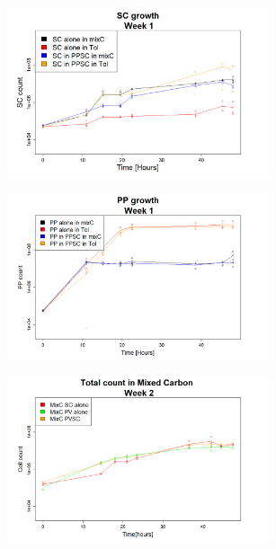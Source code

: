 \documentclass[a4paper, 10pt, conference]{ieeeconf}   %
\begin{document}
\begin{landscape}
\begin{figure}
\begin{subfigure}{.47\textheight}
			\includegraphics[width=7.71cm]{SCgrowth1.png}
			\caption{}
			\label{SCgrowth1}
		\end{subfigure}%
		\begin{subfigure}{.47\textheight}
			\centering
			\vspace{0cm}
			\includegraphics[width=7.71cm]{PPgrowth1.png}
			\caption{}
			\label{PPgrowth1}
		\end{subfigure}	
		\begin{subfigure}{.47\textheight}
			\centering
			
			\includegraphics[width=7.71cm]{totcount_mixC2.png}
			\caption{}
			\label{totcountmixC2}
		\end{subfigure}%
		\begin{subfigure}{.47\textheight}
			\centering
			

\end{subfigure}
\end{figure}
\end{landscape}
\end{document}
